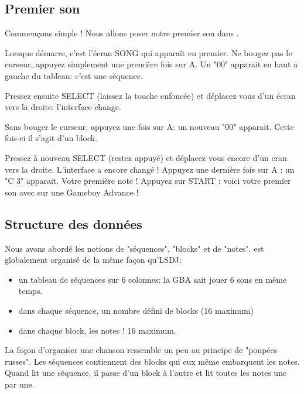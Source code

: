 \documentclass[12pt,a4paper]{article}
\begin{document}
    \subsection{Premier son}

    Commençons simple ! Nous allons poser notre premier son dans \FAT.\medskip
    
    Lorsque \FAT démarre, c'est l'écran SONG qui apparaît en premier. Ne bougez pas le curseur, appuyez simplement une première fois sur A. Un "00" apparait en haut a gauche du tableau: c'est une séquence. 
    
    
    Pressez ensuite SELECT (laissez la touche enfoncée) et déplacez vous d'un écran vers la droite: l'interface change. 
    
    
    Sans bouger le curseur, appuyez une fois sur A: un nouveau "00" apparait. Cette fois-ci il s'agit d'un block. 
    
        
    Pressez à nouveau SELECT (restez appuyé) et déplacez vous encore d'un cran vers la droite. L'interface a encore changé ! Appuyez une dernière fois sur A : un "C 3" apparait. Votre première note ! Appuyez sur START : voici votre premier son avec \FAT sur une Gameboy Advance !
    
    
    \subsection{Structure des données}
    
    Nous avons abordé les notions de "séquences", "blocks" et de "notes". \FAT est globalement organisé de la même façon qu'LSDJ:
    \begin{itemize}
        \item{un tableau de séquences sur 6 colonnes: la GBA sait jouer 6 sons en même temps.}
        \item{dans chaque séquence, un nombre défini de blocks (16 maximum)}
        \item{dans chaque block, les notes ! 16 maximum.}
    \end{itemize}\medskip
    
    La façon d'organiser une chanson ressemble un peu au principe de "poupées russes". Les séquences contiennent des blocks qui eux même embarquent les notes. Quand \FAT lit une séquence, il passe d'un block à l'autre et lit toutes les notes une par une.\medskip
    
\end{document}
